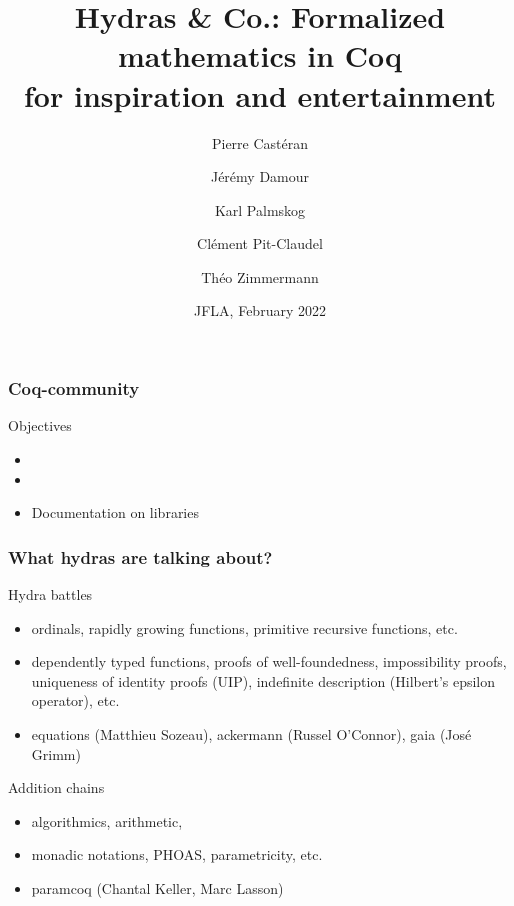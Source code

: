\documentclass[10pt]{beamer}
\title{Hydras \& Co.: Formalized mathematics in Coq\\
 for inspiration and entertainment
}
\date{JFLA, February 2022}
\author{
Pierre Castéran %
\and
    Jérémy Damour %
\and
Karl Palmskog %
\and Clément Pit-Claudel %
\and Théo Zimmermann %
}
\begin{document}
\begin{frame}
  \maketitle
\end{frame}
\begin{frame}
  \frametitle{Coq-community}
  \begin{block}{Objectives}
    \begin{itemize}
    \item
    \item
      \item Documentation on libraries
    \end{itemize}
  \end{block}
\end{frame}
\begin{frame}
  \frametitle{What hydras are talking about?}
  \begin{block}{Hydra battles}
    \begin{itemize}
\item  \textcolor{mathcolor}{ordinals},
    \textcolor{mathcolor}{rapidly growing functions},
    \textcolor{mathcolor}{primitive recursive functions}, etc.
    \item \textcolor{coqstylecolor}{dependently typed functions},
      \textcolor{coqstylecolor}{proofs of well-foundedness},
         \textcolor{coqstylecolor}{impossibility proofs},
    \textcolor{coqstylecolor}{uniqueness of identity proofs (UIP)},
      \textcolor{coqstylecolor}{indefinite description (Hilbert's epsilon operator)},
    etc.
  \item
 \textcolor{plugincolor}{equations (Matthieu Sozeau)},
    \textcolor{plugincolor}{ackermann (Russel O'Connor)},
      \textcolor{plugincolor}{gaia (Jos\'e Grimm)}
    \end{itemize}
  \end{block}

  \begin{block}{Addition chains}
    \begin{itemize}
    \item    \textcolor{mathcolor}{algorithmics},
       \textcolor{mathcolor}{arithmetic},
  \item 
    \textcolor{coqstylecolor}{monadic notations},
    \textcolor{coqstylecolor}{PHOAS},
  \textcolor{coqstylecolor}{parametricity}, etc.
    \item
      \textcolor{plugincolor}{paramcoq (Chantal Keller, Marc Lasson)} 
          \end{itemize}
  \end{block}
\end{frame}
\end{document}
